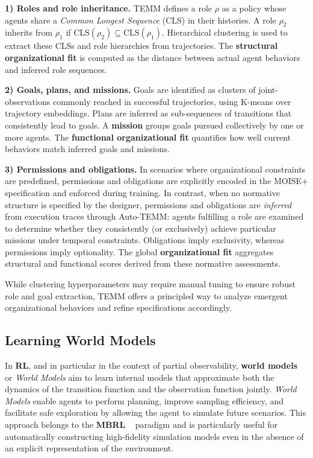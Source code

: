 \documentclass[pdflatex,sn-mathphys-num]{sn-jnl}%
\theoremstyle{thmstyleone}%
\theoremstyle{thmstyletwo}%
\theoremstyle{thmstylethree}%
\begin{document}
\textbf{1) Roles and role inheritance.} \quad TEMM defines a role $\rho$ as a policy whose agents share a \textit{Common Longest Sequence} (CLS) in their histories. A role $\rho_2$ inherits from $\rho_1$ if $\text{CLS}(\rho_2) \subseteq \text{CLS}(\rho_1)$. Hierarchical clustering is used to extract these CLSs and role hierarchies from trajectories. The \textbf{structural organizational fit} is computed as the distance between actual agent behaviors and inferred role sequences.

\textbf{2) Goals, plans, and missions.} \quad Goals are identified as clusters of joint-observations commonly reached in successful trajectories, using K-means over trajectory embeddings. Plans are inferred as sub-sequences of transitions that consistently lead to goals. A \textbf{mission} groups goals pursued collectively by one or more agents. The \textbf{functional organizational fit} quantifies how well current behaviors match inferred goals and missions.

\textbf{3) Permissions and obligations.} \quad In scenarios where organizational constraints are predefined, permissions and obligations are explicitly encoded in the MOISE+ specification and enforced during training. In contrast, when no normative structure is specified by the designer, permissions and obligations are \emph{inferred} from execution traces through Auto-TEMM: agents fulfilling a role are examined to determine whether they consistently (or exclusively) achieve particular missions under temporal constraints. Obligations imply exclusivity, whereas permissions imply optionality. The global \textbf{organizational fit} aggregates structural and functional scores derived from these normative assessments.

While clustering hyperparameters may require manual tuning to ensure robust role and goal extraction, TEMM offers a principled way to analyze emergent organizational behaviors and refine specifications accordingly.



\subsection{Learning World Models}

In \textbf{RL}, and in particular in the context of partial observability, \textbf{world models}~\cite{ha2018recurrent, hafner2020dream} or \textit{World Models} aim to learn internal models that approximate both the dynamics of the transition function and the observation function jointly. \textit{World Models} enable agents to perform planning, improve sampling efficiency, and facilitate safe exploration by allowing the agent to simulate future scenarios. This approach belongs to the \textbf{MBRL} ~\cite{moerland2020model} paradigm and is particularly useful for automatically constructing high-fidelity simulation models even in the absence of an explicit representation of the environment.
\end{document}
